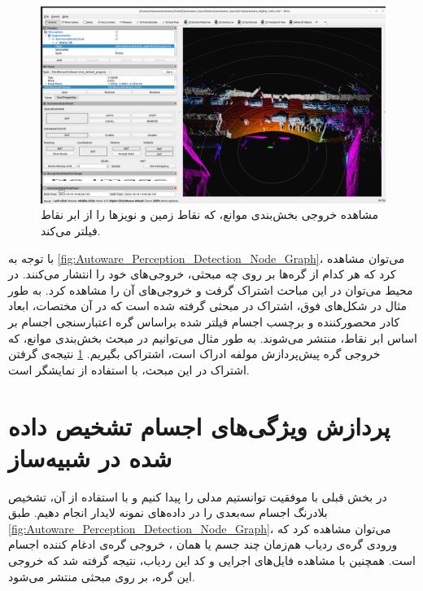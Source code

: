 \begin{figure}[h!]
    \centering
    \includegraphics[width=0.9\linewidth]{figures/3D_Obstacle_Segmentation.png}
    \caption{مشاهده خروجی بخش‌بندی موانع، که نقاط زمین و نویزها را از ابر نقاط فیلتر می‌کند.}
    \label{fig:3D_Obstacle_Segmentation}
\end{figure}

با توجه به \cref{fig:Autoware_Perception_Detection_Node_Graph}، می‌توان مشاهده کرد که هر کدام از گره‌ها بر روی چه مبحثی، خروجی‌های خود را انتشار می‌کنند. در محیط  می‌توان در این مباحث اشتراک گرفت و خروجی‌های آن را مشاهده کرد. به طور مثال در شکل‌های فوق، اشتراک در مبحثی گرفته شده است که در آن مختصات، ابعاد کادر محصورکننده و برچسب اجسام فیلتر شده براساس گره اعتبارسنجی اجسام بر اساس ابر نقاط، منتشر می‌شوند. به طور مثال می‌توانیم در مبحث بخش‌بندی موانع، که خروجی گره پیش‌پردازش مولفه ادراک است، اشتراکی بگیریم. \cref{fig:3D_Obstacle_Segmentation} نتیجه‌ی گرفتن اشتراک در این مبحث، با استفاده از نمایشگر  است.

\section{پردازش ویژگی‌های اجسام تشخیص داده شده در شبیه‌ساز}
در بخش قبلی با موفقیت توانستیم مدلی را پیدا کنیم و با استفاده از آن، تشخیص بلادرنگ اجسام سه‌بعدی را در داده‌های نمونه لایدار  انجام دهیم. طبق \cref{fig:Autoware_Perception_Detection_Node_Graph}، می‌توان مشاهده کرد که ورودی گره‌ی ردیاب ‌هم‌زمان چند جسم یا همان ، خروجی گره‌ی ادغام کننده اجسام است. همچنین با مشاهده فایل‌های اجرایی و کد این ردیاب، نتیجه گرفته شد که خروجی این گره، بر روی مبحثی منتشر می‌شود.

